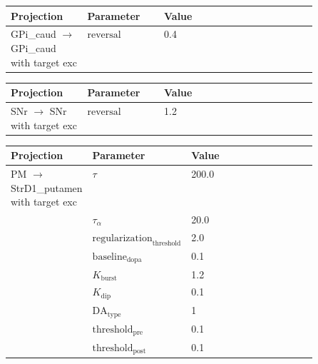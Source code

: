\documentclass{article}
\begin{document}
\noindent
\begin{tabularx}{\linewidth}{|p{0.25\linewidth}|p{0.25\linewidth}|X|}\hline
\textbf{Projection} & \textbf{Parameter} & \textbf{Value}   \\ \hline

    GPi\_caud  $\rightarrow$ GPi\_caud with target exc & ${\text{reversal}}$        & 0.4  \\ \hline

\end{tabularx}

\vspace{2ex}

\noindent
\begin{tabularx}{\linewidth}{|p{0.25\linewidth}|p{0.25\linewidth}|X|}\hline
\textbf{Projection} & \textbf{Parameter} & \textbf{Value}   \\ \hline

    SNr  $\rightarrow$ SNr with target exc & ${\text{reversal}}$        & 1.2  \\ \hline

\end{tabularx}

\vspace{2ex}

\noindent
\begin{tabularx}{\linewidth}{|p{0.25\linewidth}|p{0.25\linewidth}|X|}\hline
\textbf{Projection} & \textbf{Parameter} & \textbf{Value}   \\ \hline

    PM  $\rightarrow$ StrD1\_putamen with target exc & $\tau$        & 200.0  \\ \hline

     & $\tau_\alpha$        & 20.0  \\ \hline

     & ${\text{regularization}}_{\text{threshold}}$        & 2.0  \\ \hline

     & ${\text{baseline}}_{\text{dopa}}$        & 0.1  \\ \hline

     & $K_{\text{burst}}$        & 1.2  \\ \hline

     & $K_{\text{dip}}$        & 0.1  \\ \hline

     & ${\text{DA}}_{\text{type}}$        & 1  \\ \hline

     & ${\text{threshold}}_{\text{pre}}$        & 0.1  \\ \hline

     & ${\text{threshold}}_{\text{post}}$        & 0.1  \\ \hline

\end{tabularx}
\end{document}
